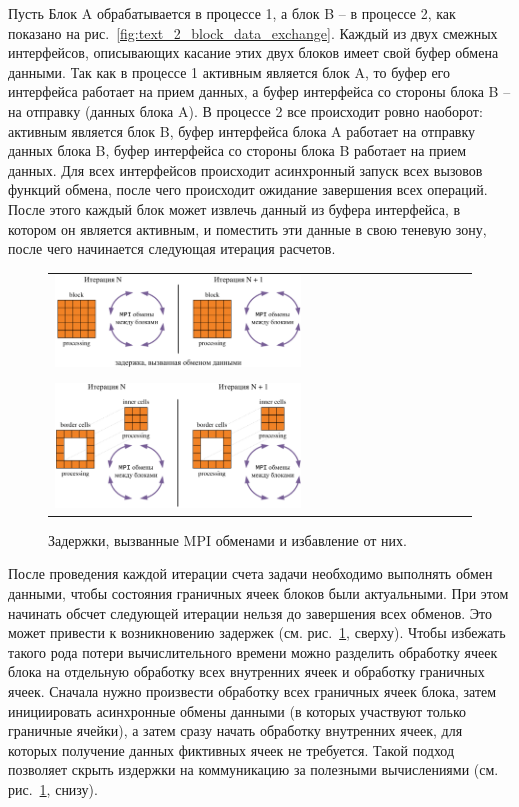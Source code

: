 Пусть Блок A обрабатывается в процессе 1, а блок B -- в процессе 2, как показано на рис.~\ref{fig:text_2_block_data_exchange}.
Каждый из двух смежных интерфейсов, описывающих касание этих двух блоков имеет свой буфер обмена данными.
Так как в процессе 1 активным является блок A, то буфер его интерфейса работает на прием данных, а буфер интерфейса со стороны блока B -- на отправку (данных блока A).
В процессе 2 все происходит ровно наоборот: активным является блок B, буфер интерфейса блока A работает на отправку данных блока B, буфер интерфейса со стороны блока B работает на прием данных.
Для всех интерфейсов происходит асинхронный запуск всех вызовов функций обмена, после чего происходит ожидание завершения всех операций.
После этого каждый блок может извлечь данный из буфера интерфейса, в котором он является активным, и поместить эти данные в свою теневую зону, после чего начинается следующая итерация расчетов.

\begin{figure}[ht]
\centering
\begin{tabular}{l}
\includegraphics[width=0.6\textwidth]{fig/par_11-mpi1.png}
\\
\\
\includegraphics[width=0.6\textwidth]{fig/par_12-mpi2.png}
\end{tabular}
\singlespacing
{}\caption{Задержки, вызванные MPI обменами и избавление от них.}
\label{fig:text_2_block_mpi1}
\end{figure}

После проведения каждой итерации счета задачи необходимо выполнять обмен данными, чтобы состояния граничных ячеек блоков были актуальными.
При этом начинать обсчет следующей итерации нельзя до завершения всех обменов.
Это может привести к возникновению задержек (см. рис.~\ref{fig:text_2_block_mpi1}, сверху).
Чтобы избежать такого рода потери вычислительного времени можно разделить обработку ячеек блока на отдельную обработку всех внутренних ячеек и обработку граничных ячеек.
Сначала нужно произвести обработку всех граничных ячеек блока, затем инициировать асинхронные обмены данными (в которых участвуют только граничные ячейки), а затем сразу начать обработку внутренних ячеек, для которых получение данных фиктивных ячеек не требуется.
Такой подход позволяет скрыть издержки на коммуникацию за полезными вычислениями (см. рис.~\ref{fig:text_2_block_mpi1}, снизу).

